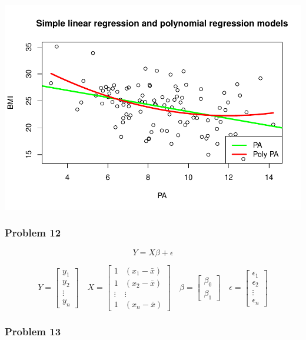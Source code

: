 \documentclass[
]{article}
\begin{document}
\includegraphics{MA_331_Final_-_Amane_and_Harry--2-_files/figure-latex/unnamed-chunk-11-1.pdf}

\hypertarget{problem-12}{%
\subsubsection{Problem 12}\label{problem-12}}

\[
Y = X \beta + \epsilon
\]

\[
Y = \begin{bmatrix}
    y_1 \\
    y_2 \\
    \vdots \\
    y_n
\end{bmatrix} \quad
X = \begin{bmatrix}
    1 & (x_1 - \bar{x}) \\
    1 & (x_2 - \bar{x}) \\
    \vdots & \vdots \\
    1 & (x_n - \bar{x})
\end{bmatrix} \quad
\beta = \begin{bmatrix}
    \beta_0 \\
    \beta_1
\end{bmatrix} \quad
\epsilon = \begin{bmatrix}
    \epsilon_1 \\
    \epsilon_2 \\
    \vdots \\
    \epsilon_n
\end{bmatrix}
\]

\hfill\break

\hypertarget{problem-13}{%
\subsubsection{Problem 13}\label{problem-13}}
\end{document}

